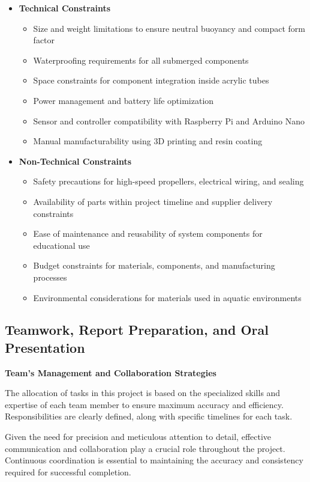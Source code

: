 \begin{itemize}
	\item \textbf{Technical Constraints}

{
	\begin{itemize}
		\item Size and weight limitations to ensure neutral buoyancy and compact form factor
		\item Waterproofing requirements for all submerged components
		\item Space constraints for component integration inside acrylic tubes
		\item Power management and battery life optimization
		\item Sensor and controller compatibility with Raspberry Pi and Arduino Nano
		\item Manual manufacturability using 3D printing and resin coating
	\end{itemize}
}

	\item \textbf{Non-Technical Constraints}

{
	\begin{itemize}
		\item Safety precautions for high-speed propellers, electrical wiring, and sealing 
		\item Availability of parts within project timeline and supplier delivery constraints
		\item Ease of maintenance and reusability of system components for educational use
		\item Budget constraints for materials, components, and manufacturing processes
		\item Environmental considerations for materials used in aquatic environments
	\end{itemize}
}

\end{itemize}
\subsection{Teamwork, Report Preparation, and Oral Presentation}

\textbf{Team's Management and Collaboration Strategies}

The allocation of tasks in this project is based on the 
specialized skills and expertise of each team member to 
ensure maximum accuracy and efficiency. Responsibilities 
are clearly defined, along with specific timelines for 
each task. 

Given the need for precision and meticulous attention 
to detail, effective communication and collaboration 
play a crucial role throughout the project. Continuous 
coordination is essential to maintaining the accuracy 
and consistency required for successful completion.

